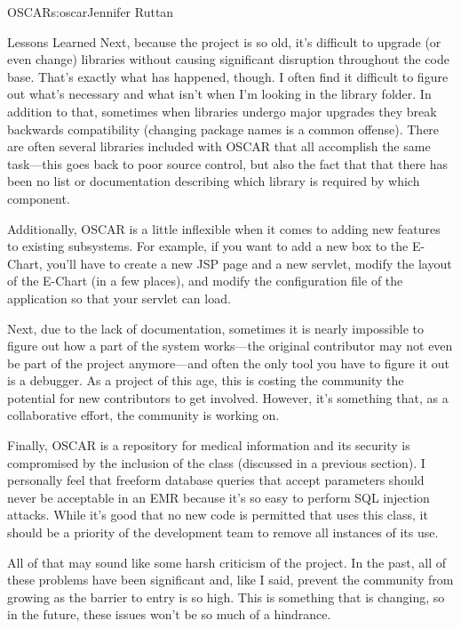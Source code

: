 \begin{aosachapter}{OSCAR}{s:oscar}{Jennifer Ruttan}
\begin{aosasect1}{Lessons Learned}
Next, because the project is so old, it's difficult to upgrade (or
even change) libraries without causing significant disruption
throughout the code base. That's exactly what has happened, though. I
often find it difficult to figure out what's necessary and what isn't
when I'm looking in the library folder. In addition to that, sometimes
when libraries undergo major upgrades they break backwards
compatibility (changing package names is a common offense). There are
often several libraries included with OSCAR that all accomplish the same
task---this goes back to poor source control, but also the fact that
that there has
been no list or documentation describing which library is required by
which component.

Additionally, OSCAR is a little inflexible when it comes to adding new
features to existing subsystems. For example, if you want to add a new
box to the E-Chart, you'll have to create a new JSP page and a new
servlet, modify the layout of the E-Chart (in a few places), and
modify the configuration file of the application so that your servlet
can load.

Next, due to the lack of documentation, sometimes it is nearly
impossible to figure out how a part of the system works---the original
contributor may not even be part of the project anymore---and often
the only tool you have to figure it out is a debugger. As a project of
this age, this is costing the community the potential for new
contributors to get involved. However, it's something that, as a
collaborative effort, the community is working on.

Finally, OSCAR is a repository for medical information and its
security is compromised by the inclusion of the  class
(discussed in a previous section). I personally feel that freeform
database queries that accept parameters should never be acceptable in
an EMR because it's so easy to perform SQL injection attacks. While
it's good that no new code is permitted that uses this class, it
should be a priority of the development team to remove all instances
of its use.

All of that may sound like some harsh criticism of the project. In the
past, all of these problems have been significant and, like I said,
prevent the community from growing as the barrier to entry is so
high. This is something that is changing, so in the future, these
issues won't be so much of a hindrance.


\end{aosasect1}
\end{aosachapter}

